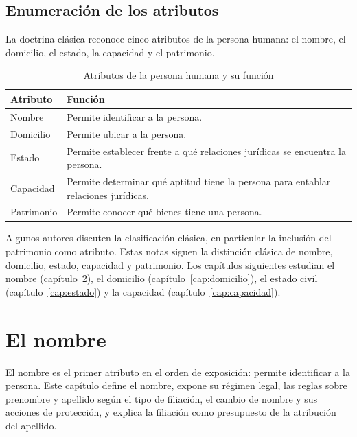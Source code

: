 \documentclass[12pt,oneside]{book}
\begin{document}
\section{Enumeración de los atributos}

La doctrina clásica reconoce cinco atributos de la persona humana: el nombre, el domicilio, el estado, la capacidad y el patrimonio.

\begin{table}[H]
\centering
\begin{tabularx}{\textwidth}{B{0.20\textwidth} Y}
\toprule
\textbf{Atributo} & \textbf{Función} \\
\midrule
Nombre & Permite identificar a la persona. \\
Domicilio & Permite ubicar a la persona. \\
Estado & Permite establecer frente a qué relaciones jurídicas se encuentra la persona. \\
Capacidad & Permite determinar qué aptitud tiene la persona para entablar relaciones jurídicas. \\
Patrimonio & Permite conocer qué bienes tiene una persona. \\
\bottomrule
\end{tabularx}
\caption{Atributos de la persona humana y su función}
\end{table}

\begin{nota}
Algunos autores discuten la clasificación clásica, en particular la inclusión del patrimonio como atributo. Estas notas siguen la distinción clásica de nombre, domicilio, estado, capacidad y patrimonio. Los capítulos siguientes estudian el nombre (capítulo~\ref{cap:nombre}), el domicilio (capítulo~\ref{cap:domicilio}), el estado civil (capítulo~\ref{cap:estado}) y la capacidad (capítulo~\ref{cap:capacidad}).
\end{nota}

\chapter{El nombre}
\label{cap:nombre}

El nombre es el primer atributo en el orden de exposición: permite identificar a la persona. Este capítulo define el nombre, expone su régimen legal, las reglas sobre prenombre y apellido según el tipo de filiación, el cambio de nombre y sus acciones de protección, y explica la filiación como presupuesto de la atribución del apellido.
\end{document}
